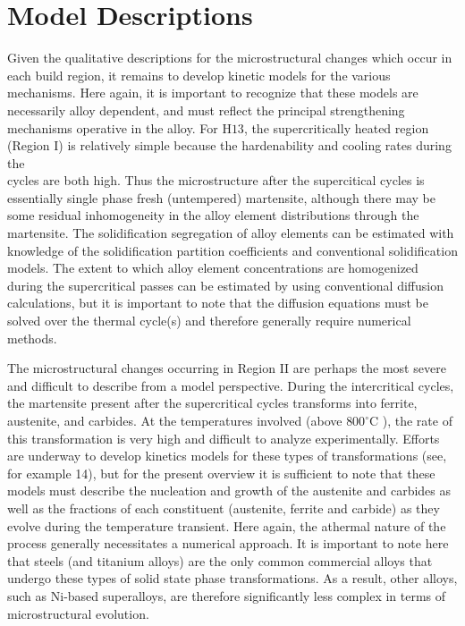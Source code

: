 \documentclass[10pt]{article}
\begin{document}
\section*{Model Descriptions}
Given the qualitative descriptions for the microstructural changes which occur in each build region, it remains to develop kinetic models for the various mechanisms. Here again, it is important to recognize that these models are necessarily alloy dependent, and must reflect the principal strengthening mechanisms operative in the alloy. For $\mathrm{H} 13$, the supercritically heated region (Region I) is relatively simple because the hardenability and cooling rates during the\\
cycles are both high. Thus the microstructure after the supercitical cycles is essentially single phase fresh (untempered) martensite, although there may be some residual inhomogeneity in the alloy element distributions through the martensite. The solidification segregation of alloy elements can be estimated with knowledge of the solidification partition coefficients and conventional solidification models. The extent to which alloy element concentrations are homogenized during the supercritical passes can be estimated by using conventional diffusion calculations, but it is important to note that the diffusion equations must be solved over the thermal cycle(s) and therefore generally require numerical methods.

The microstructural changes occurring in Region II are perhaps the most severe and difficult to describe from a model perspective. During the intercritical cycles, the martensite present after the supercritical cycles transforms into ferrite, austenite, and carbides. At the temperatures involved (above $800^{\circ} \mathrm{C}$ ), the rate of this transformation is very high and difficult to analyze experimentally. Efforts are underway to develop kinetics models for these types of transformations (see, for example 14), but for the present overview it is sufficient to note that these models must describe the nucleation and growth of the austenite and carbides as well as the fractions of each constituent (austenite, ferrite and carbide) as they evolve during the temperature transient. Here again, the athermal nature of the process generally necessitates a numerical approach. It is important to note here that steels (and titanium alloys) are the only common commercial alloys that undergo these types of solid state phase transformations. As a result, other alloys, such as Ni-based superalloys, are therefore significantly less complex in terms of microstructural evolution.
\end{document}
